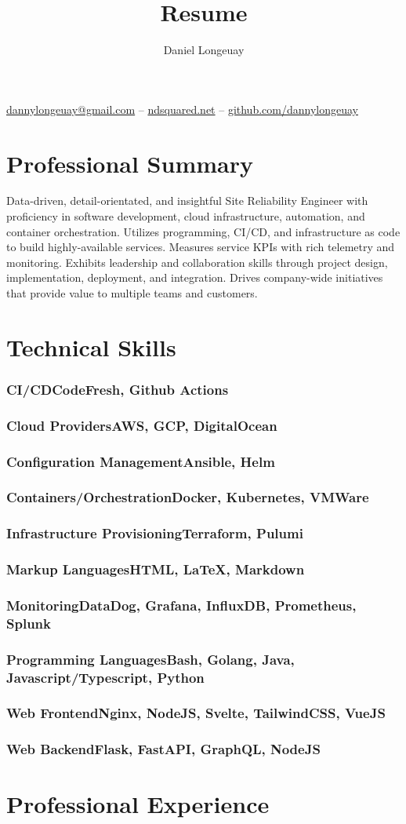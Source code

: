 \documentclass[letterpaper,11pt]{article}
\makeatletter
\renewcommand{\maketitle}{
  \begin{center}
    {\huge\bfseries\theauthor}

    \vspace{.25em}

    {\href{mailto:dannylongeuay@gmail.com}{dannylongeuay@gmail.com} -- \href{https://ndsquared.net/}{ndsquared.net} -- \href{https://github.com/dannylongeuay}{github.com/dannylongeuay}}
  \end{center}
}
\newcommand{\skill}[2]{\subsubsection{\hspace{.5em}#1\hfill\mdseries#2}\vspace{-.5em}}
\makeatother
\begin{document}
\title{Resume}
\author{Daniel Longeuay}

\maketitle

\section{Professional Summary}

Data-driven, detail-orientated, and insightful Site Reliability Engineer with proficiency in software
development, cloud infrastructure, automation, and container orchestration. Utilizes programming, CI/CD,
and infrastructure as code to build highly-available services. Measures service KPIs with rich telemetry
and monitoring. Exhibits leadership and collaboration skills through project design, implementation, 
deployment, and integration. Drives company-wide initiatives that provide value to multiple teams and customers.

\section{Technical Skills}

  \skill{CI/CD}{CodeFresh, Github Actions}

  \skill{Cloud Providers}{AWS, GCP, DigitalOcean}

  \skill{Configuration Management}{Ansible, Helm}

  \skill{Containers/Orchestration}{Docker, Kubernetes, VMWare}

  \skill{Infrastructure Provisioning}{Terraform, Pulumi}

  \skill{Markup Languages}{HTML, {\LaTeX}, Markdown}

  \skill{Monitoring}{DataDog, Grafana, InfluxDB, Prometheus, Splunk}

  \skill{Programming Languages}{Bash, Golang, Java, Javascript/Typescript, Python}

  \skill{Web Frontend}{Nginx, NodeJS, Svelte, TailwindCSS, VueJS}

  \skill{Web Backend}{Flask, FastAPI, GraphQL, NodeJS}

\section{\vspace{.5em}Professional Experience}
\end{document}
